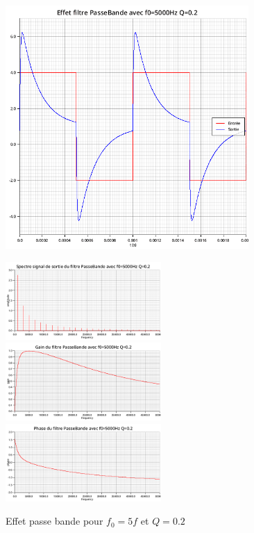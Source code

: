 \documentclass{article}
\begin{document}
\begin{figure}[H]
  \begin{minipage}{0.6\textwidth}
      \centering
      \includegraphics[width=25em]{images/creneau/bande/q=0.2/5/signals.png}
  \end{minipage}
  \begin{minipage}{0.3\textwidth}
      \centering
      \includegraphics[width=16em]{images/creneau/bande/q=0.2/5/fft_out.png}
      \vfill
      \includegraphics[width=16em]{images/creneau/bande/q=0.2/5/gain.png}
      \vfill
      \includegraphics[width=16em]{images/creneau/bande/q=0.2/5/phase.png}
  \end{minipage}
  \caption{Effet passe bande pour $f_0=5f$ et $Q=0.2$}
\end{figure}
\end{document}

